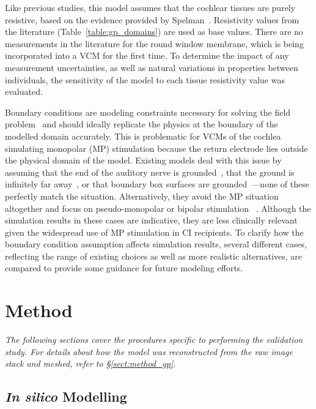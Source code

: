 Like previous studies, this model assumes that the cochlear tissues are purely
resistive, based on the evidence provided by Spelman~\cite{spelman1982}.
Resistivity values from the literature (Table~\ref{table:gp_domains}) are used
as base values. There are no measurements in the literature for the round window
membrane, which is being incorporated into a VCM for the first time. To
determine the impact of any measurement uncertainties, as well as natural
variations in properties between individuals, the sensitivity of the model to
each tissue resistivity value was evaluated.

Boundary conditions are modeling constraints necessary for solving the field
problem~\cite{johnson2006} and should ideally replicate the physics at the
boundary of the modelled domain accurately. This is problematic for VCMs of the
cochlea simulating monopolar (MP) stimulation because the return electrode lies
outside the physical domain of the model. Existing models deal with this issue
by assuming that the end of the auditory nerve is
grounded~\cite{girzon1987,whiten2007}, that the ground is infinitely far
away~\cite{frijns2000}, or that boundary box surfaces are
grounded~\cite{rattay2001model,saba2012}---none of these perfectly match the
\invivo{} situation. Alternatively, they avoid the MP situation altogether and
focus on pseudo-monopolar or bipolar stimulation
~\cite{finley1990,frijns1995,hanekom2001,choi2004}. Although the simulation
results in these cases are indicative, they are less clinically relevant given
the widespread use of MP stimulation in CI recipients. To clarify how the
boundary condition assumption affects simulation results, several different
cases, reflecting the range of existing choices as well as more realistic
alternatives, are compared to provide some guidance for future modeling efforts.

\section{Method}

\textit{The following sections cover the procedures specific to performing the
validation study. For details about how the model was reconstructed from the
raw image stack and meshed, refer to \S{\ref{sect:method_gp}}.}

\subsection{\textit{In silico} Modelling}

